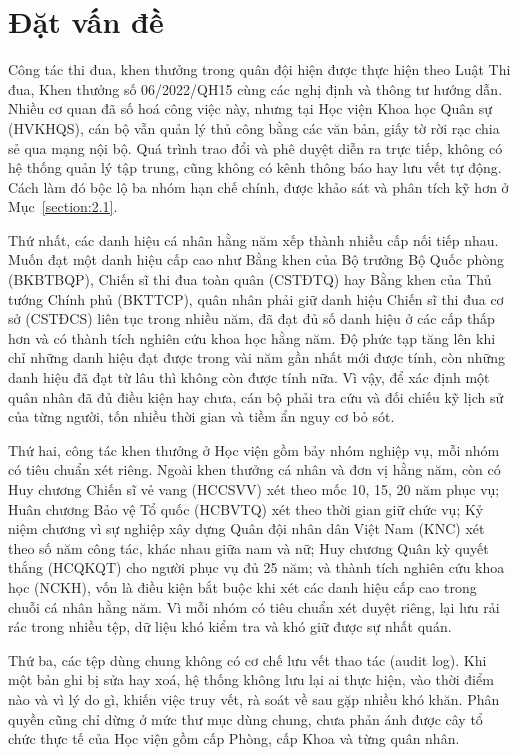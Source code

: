 \documentclass[../DoAn.tex]{subfiles}
\begin{document}
\section{Đặt vấn đề}
\label{section:1.1}

Công tác thi đua, khen thưởng trong quân đội hiện được thực hiện theo Luật Thi đua, Khen thưởng số 06/2022/QH15 \cite{luat062022} cùng các nghị định và thông tư hướng dẫn. Nhiều cơ quan đã số hoá công việc này, nhưng tại Học viện Khoa học Quân sự (HVKHQS), cán bộ vẫn quản lý thủ công bằng các văn bản, giấy tờ rời rạc chia sẻ qua mạng nội bộ. Quá trình trao đổi và phê duyệt diễn ra trực tiếp, không có hệ thống quản lý tập trung, cũng không có kênh thông báo hay lưu vết tự động. Cách làm đó bộc lộ ba nhóm hạn chế chính, được khảo sát và phân tích kỹ hơn ở Mục~\ref{section:2.1}.

Thứ nhất, các danh hiệu cá nhân hằng năm xếp thành nhiều cấp nối tiếp nhau. Muốn đạt một danh hiệu cấp cao như Bằng khen của Bộ trưởng Bộ Quốc phòng (BKBTBQP), Chiến sĩ thi đua toàn quân (CSTĐTQ) hay Bằng khen của Thủ tướng Chính phủ (BKTTCP), quân nhân phải giữ danh hiệu Chiến sĩ thi đua cơ sở (CSTĐCS) liên tục trong nhiều năm, đã đạt đủ số danh hiệu ở các cấp thấp hơn và có thành tích nghiên cứu khoa học hằng năm. Độ phức tạp tăng lên khi chỉ những danh hiệu đạt được trong vài năm gần nhất mới được tính, còn những danh hiệu đã đạt từ lâu thì không còn được tính nữa. Vì vậy, để xác định một quân nhân đã đủ điều kiện hay chưa, cán bộ phải tra cứu và đối chiếu kỹ lịch sử của từng người, tốn nhiều thời gian và tiềm ẩn nguy cơ bỏ sót.

Thứ hai, công tác khen thưởng ở Học viện gồm bảy nhóm nghiệp vụ, mỗi nhóm có tiêu chuẩn xét riêng. Ngoài khen thưởng cá nhân và đơn vị hằng năm, còn có Huy chương Chiến sĩ vẻ vang (HCCSVV) xét theo mốc 10, 15, 20 năm phục vụ; Huân chương Bảo vệ Tổ quốc (HCBVTQ) xét theo thời gian giữ chức vụ; Kỷ niệm chương vì sự nghiệp xây dựng Quân đội nhân dân Việt Nam (KNC) xét theo số năm công tác, khác nhau giữa nam và nữ; Huy chương Quân kỳ quyết thắng (HCQKQT) cho người phục vụ đủ 25 năm; và thành tích nghiên cứu khoa học (NCKH), vốn là điều kiện bắt buộc khi xét các danh hiệu cấp cao trong chuỗi cá nhân hằng năm. Vì mỗi nhóm có tiêu chuẩn xét duyệt riêng, lại lưu rải rác trong nhiều tệp, dữ liệu khó kiểm tra và khó giữ được sự nhất quán.

Thứ ba, các tệp dùng chung không có cơ chế lưu vết thao tác (audit log). Khi một bản ghi bị sửa hay xoá, hệ thống không lưu lại ai thực hiện, vào thời điểm nào và vì lý do gì, khiến việc truy vết, rà soát về sau gặp nhiều khó khăn. Phân quyền cũng chỉ dừng ở mức thư mục dùng chung, chưa phản ánh được cây tổ chức thực tế của Học viện gồm cấp Phòng, cấp Khoa và từng quân nhân.
\end{document}
